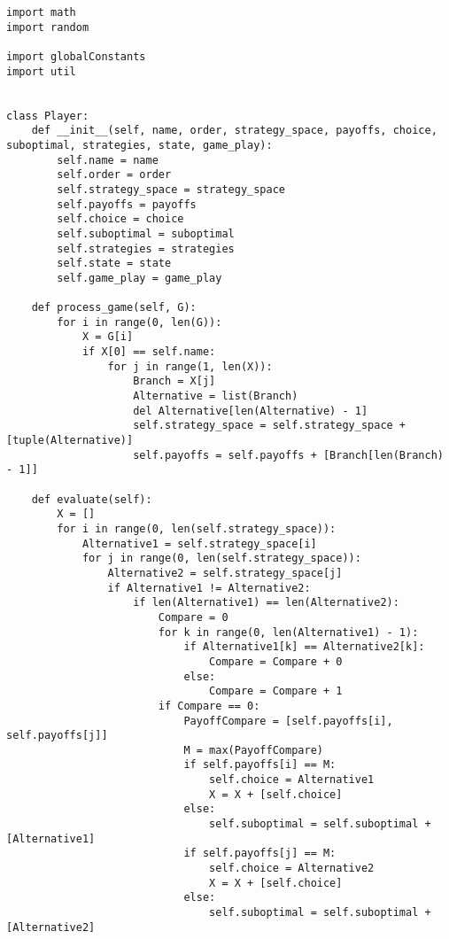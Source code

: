  \begin{lstlisting}[style=fsharpstyle]
import math
import random

import globalConstants
import util


class Player:
    def __init__(self, name, order, strategy_space, payoffs, choice, suboptimal, strategies, state, game_play):
        self.name = name
        self.order = order
        self.strategy_space = strategy_space
        self.payoffs = payoffs
        self.choice = choice
        self.suboptimal = suboptimal
        self.strategies = strategies
        self.state = state
        self.game_play = game_play

    def process_game(self, G):
        for i in range(0, len(G)):
            X = G[i]
            if X[0] == self.name:
                for j in range(1, len(X)):
                    Branch = X[j]
                    Alternative = list(Branch)
                    del Alternative[len(Alternative) - 1]
                    self.strategy_space = self.strategy_space + [tuple(Alternative)]
                    self.payoffs = self.payoffs + [Branch[len(Branch) - 1]]

    def evaluate(self):
        X = []
        for i in range(0, len(self.strategy_space)):
            Alternative1 = self.strategy_space[i]
            for j in range(0, len(self.strategy_space)):
                Alternative2 = self.strategy_space[j]
                if Alternative1 != Alternative2:
                    if len(Alternative1) == len(Alternative2):
                        Compare = 0
                        for k in range(0, len(Alternative1) - 1):
                            if Alternative1[k] == Alternative2[k]:
                                Compare = Compare + 0
                            else:
                                Compare = Compare + 1
                        if Compare == 0:
                            PayoffCompare = [self.payoffs[i], self.payoffs[j]]
                            M = max(PayoffCompare)
                            if self.payoffs[i] == M:
                                self.choice = Alternative1
                                X = X + [self.choice]
                            else:
                                self.suboptimal = self.suboptimal + [Alternative1]
                            if self.payoffs[j] == M:
                                self.choice = Alternative2
                                X = X + [self.choice]
                            else:
                                self.suboptimal = self.suboptimal + [Alternative2]


\end{lstlisting}
